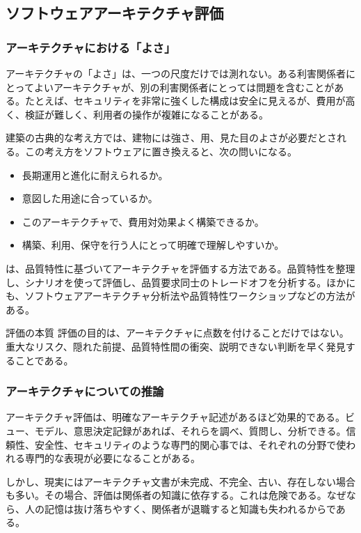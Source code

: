 \subsection{ソフトウェアアーキテクチャ評価}

\subsubsection{アーキテクチャにおける「よさ」}
アーキテクチャの「よさ」は、一つの尺度だけでは測れない。ある利害関係者にとってよいアーキテクチャが、別の利害関係者にとっては問題を含むことがある。たとえば、セキュリティを非常に強くした構成は安全に見えるが、費用が高く、検証が難しく、利用者の操作が複雑になることがある。

建築の古典的な考え方では、建物には強さ、用、見た目のよさが必要だとされる。この考え方をソフトウェアに置き換えると、次の問いになる。
\begin{itemize}
  \item 長期運用と進化に耐えられるか。
  \item 意図した用途に合っているか。
  \item このアーキテクチャで、費用対効果よく構築できるか。
  \item 構築、利用、保守を行う人にとって明確で理解しやすいか。
\end{itemize}

は、品質特性に基づいてアーキテクチャを評価する方法である。品質特性を整理し、シナリオを使って評価し、品質要求同士のトレードオフを分析する。ほかにも、ソフトウェアアーキテクチャ分析法や品質特性ワークショップなどの方法がある。

\begin{statementbox}{評価の本質}
評価の目的は、アーキテクチャに点数を付けることだけではない。重大なリスク、隠れた前提、品質特性間の衝突、説明できない判断を早く発見することである。
\end{statementbox}

\subsubsection{アーキテクチャについての推論}
アーキテクチャ評価は、明確なアーキテクチャ記述があるほど効果的である。ビュー、モデル、意思決定記録があれば、それらを調べ、質問し、分析できる。信頼性、安全性、セキュリティのような専門的関心事では、それぞれの分野で使われる専門的な表現が必要になることがある。

しかし、現実にはアーキテクチャ文書が未完成、不完全、古い、存在しない場合も多い。その場合、評価は関係者の知識に依存する。これは危険である。なぜなら、人の記憶は抜け落ちやすく、関係者が退職すると知識も失われるからである。

